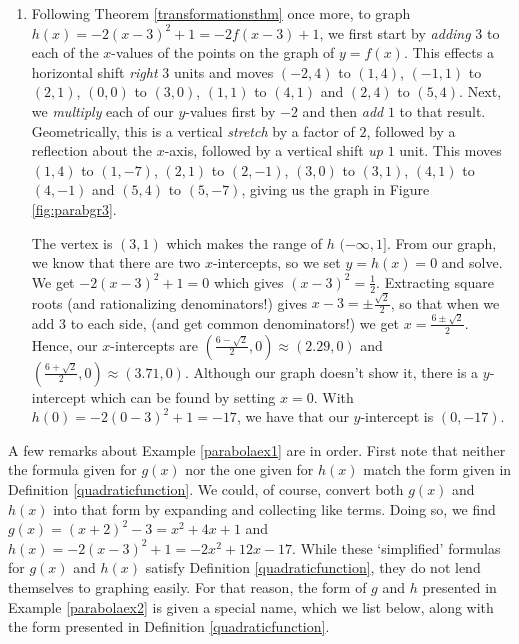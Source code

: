 {\begin{enumerate}
\item  Following Theorem \ref{transformationsthm} once more, to graph  $h(x) = -2(x-3)^2+1 = -2f(x-3)+1$, we first start by \textit{adding} $3$ to each of the $x$-values of the points on the graph of $y=f(x)$.  This effects a horizontal shift \textit{right} $3$ units and moves $(-2,4)$ to $(1,4)$, $(-1,1)$ to $(2,1)$, $(0,0)$ to $(3,0)$, $(1,1)$ to $(4,1)$ and $(2,4)$ to $(5,4)$.  Next, we \textit{multiply} each of our $y$-values first by $-2$ and then \textit{add} $1$ to that result.  Geometrically, this is a vertical \textit{stretch} by a factor of $2$, followed by a reflection about the $x$-axis, followed by a vertical shift \textit{up} $1$ unit.  This moves $(1,4)$ to $(1,-7)$, $(2,1)$ to $(2,-1)$, $(3,0)$ to $(3,1)$,  $(4,1)$ to $(4,-1)$ and $(5,4)$ to $(5,-7)$, giving us the graph in Figure \ref{fig:parabgr3}.





The vertex is $(3,1)$ which makes the range of $h$ $(-\infty, 1]$.  From our graph, we know that there are two $x$-intercepts, so we set $y = h(x) = 0$ and solve.  We get $-2(x-3)^2+1 = 0$ which gives $(x-3)^2 = \frac{1}{2}$.  Extracting square roots (and rationalizing denominators!) gives $x - 3 = \pm \frac{\sqrt{2}}{2}$, so that when we add $3$ to each side, (and get common denominators!) we get $x = \frac{6 \pm \sqrt{2}}{2}$.  Hence, our $x$-intercepts are $\left(\frac{6 - \sqrt{2}}{2}, 0 \right) \approx (2.29, 0)$ and $\left(\frac{6 + \sqrt{2}}{2}, 0 \right) \approx (3.71, 0)$.  Although our graph doesn't show it, there is a $y$-intercept which can be found by setting $x=0$.  With $h(0) = -2(0-3)^2+1 = -17$, we have that our $y$-intercept is $(0,-17)$. 
\end{enumerate}
}

\medskip

A few remarks about Example \ref{parabolaex1} are in order.  First note that neither the formula given for $g(x)$ nor the one given for $h(x)$ match the form given in Definition \ref{quadraticfunction}. We could, of course, convert both $g(x)$ and $h(x)$ into that form by expanding and collecting like terms. Doing so, we find $g(x) = (x+2)^2 - 3 = x^2 + 4x+1$ and  $h(x) = -2(x-3)^2+1 = -2x^2+12x-17$.  While these `simplified' formulas for $g(x)$ and $h(x)$ satisfy  Definition \ref{quadraticfunction}, they do not lend themselves to graphing easily.  For that reason, the form of $g$ and $h$ presented in Example \ref{parabolaex2} is given a special name, which we list below, along with the form presented in  Definition \ref{quadraticfunction}.



